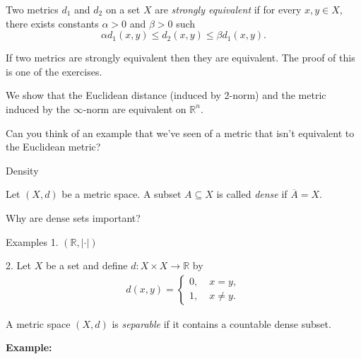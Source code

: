\documentclass [aspectratio=169]{beamer}
\newcommand{\R}{{\mathbb{R}}}
\begin{document}
\begin{frame}

\begin{definition}
Two metrics $d_1$ and $d_2$ on a set $X$ are \emph{strongly equivalent} if for every $x,y\in X$, there exists constants $\alpha>0$ and $\beta>0$ such
\begin{equation*}
    \alpha d_1(x,y) \leq d_2(x,y) \leq \beta d_1(x,y).
\end{equation*}
\end{definition}

If two metrics are strongly equivalent then they are equivalent. The proof of this is one of the exercises. 
\end{frame}

\begin{frame}
\begin{example}
We show that the Euclidean distance (induced by 2-norm) and the metric induced by the $\infty$-norm are equivalent on $\R^n$. 
\vspace{5cm}
\end{example}
Can you think of an example that we've seen of a metric that isn't equivalent to the Euclidean metric?
\end{frame}


\begin{frame}{Density}
\begin{definition}
Let $(X,d)$ be a metric space. A subset $A\subseteq X$ is called \emph{dense} if $\overline{A} = X$.
\end{definition}
\vspace{2.5cm}
Why are dense sets important?
\end{frame}

\begin{frame}{Examples}
1. $(\R,\vert \cdot \vert)$
\vspace{2.5cm}

2. Let $X$ be a set and define $d\colon X \times X \to \mathbb{R}$ by 
    \begin{align*}
        d(x,y) = \begin{cases}
            0, & \; x=y, \\
            1, & \; x\neq y.
        \end{cases}
    \end{align*}
\vspace{2.5cm}
\end{frame}

\begin{frame}
\begin{definition}
A metric space $(X,d)$ is \emph{separable} if it contains a countable dense subset.
\end{definition}

\vspace{1em}
\textbf{Example:}

\end{frame}
\end{document}
